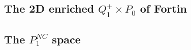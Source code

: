 \subsection{The 2D enriched $Q_1^+\times P_0$ of Fortin} \label{ss:Q1pP02D}




\subsection{The $P_1^{NC}$ space} \label{ss:p1nc}




